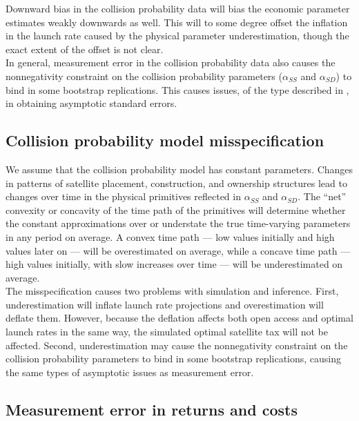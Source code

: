 \documentclass[12pt]{article}
\begin{document}
Downward bias in the collision probability data will bias the economic parameter estimates weakly downwards as well. This will to some degree offset the inflation in the launch rate caused by the physical parameter underestimation, though the exact extent of the offset is not clear. \\

In general, measurement error in the collision probability data also causes the nonnegativity constraint on the collision probability parameters ($\alpha_{SS}$ and $\alpha_{SD}$) to bind in some bootstrap replications. This causes issues, of the type described in \citep{ketz2018}, in obtaining asymptotic standard errors.

\subsection{Collision probability model misspecification}

We assume that the collision probability model has constant parameters. Changes in patterns of satellite placement, construction, and ownership structures lead to changes over time in the physical primitives reflected in $\alpha_{SS}$ and $\alpha_{SD}$. The ``net'' convexity or concavity of the time path of the primitives will determine whether the constant approximations over or understate the true time-varying parameters in any period on average. A convex time path --- low values initially and high values later on --- will be overestimated on average, while a concave time path --- high values initially, with slow increases over time --- will be underestimated on average. \\

The misspecification causes two problems with simulation and inference. First, underestimation will inflate launch rate projections and overestimation will deflate them. However, because the deflation affects both open access and optimal launch rates in the same way, the simulated optimal satellite tax will not be affected. Second, underestimation may cause the nonnegativity constraint on the collision probability parameters to bind in some bootstrap replications, causing the same types of asymptotic issues as measurement error.

\subsection{Measurement error in returns and costs}
\label{attenuationFactors}
\end{document}
